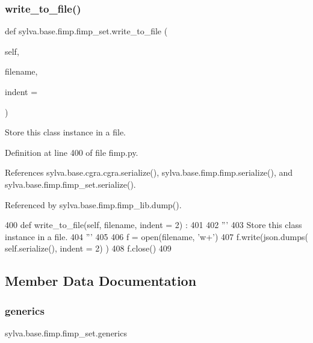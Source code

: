 \subsubsection{\texorpdfstring{write\+\_\+to\+\_\+file()}{write\_to\_file()}}
{\footnotesize\ttfamily def sylva.\+base.\+fimp.\+fimp\+\_\+set.\+write\+\_\+to\+\_\+file (\begin{DoxyParamCaption}\item[{}]{self,  }\item[{}]{filename,  }\item[{}]{indent = {} }\end{DoxyParamCaption})}

\begin{DoxyVerb}  Store this class instance in a file.
\end{DoxyVerb}
 

Definition at line 400 of file fimp.\+py.



References sylva.\+base.\+cgra.\+cgra.\+serialize(), sylva.\+base.\+fimp.\+fimp.\+serialize(), and sylva.\+base.\+fimp.\+fimp\+\_\+set.\+serialize().



Referenced by sylva.\+base.\+fimp.\+fimp\+\_\+lib.\+dump().


\begin{DoxyCode}
400     \textcolor{keyword}{def }write\_to\_file(self, filename, indent = 2) :
401 
402       \textcolor{stringliteral}{'''}
403 \textcolor{stringliteral}{        Store this class instance in a file.}
404 \textcolor{stringliteral}{      '''}
405 
406       f = open(filename, \textcolor{stringliteral}{'w+'})
407       f.write(json.dumps( self.serialize(), indent = 2) )
408       f.close()
409 
\end{DoxyCode}


\subsection{Member Data Documentation}
\mbox{\label{classsylva_1_1base_1_1fimp_1_1fimp__set_adc6c36ee3cf53a82b121bec2cbc58ab5}} 
\subsubsection{\texorpdfstring{generics}{generics}}
{\footnotesize\ttfamily sylva.\+base.\+fimp.\+fimp\+\_\+set.\+generics}



